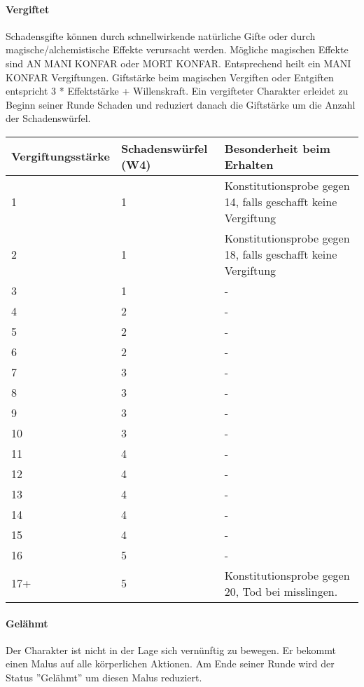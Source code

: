 \documentclass{article}
\begin{document}
\paragraph{Vergiftet}

Schadensgifte können durch schnellwirkende natürliche Gifte oder durch magische/alchemistische Effekte verursacht
werden. Mögliche magischen Effekte sind AN MANI KONFAR oder MORT KONFAR. Entsprechend heilt ein MANI KONFAR
Vergiftungen. Giftstärke beim magischen Vergiften oder Entgiften entspricht 3 * Effektstärke + Willenskraft. Ein
vergifteter Charakter erleidet zu Beginn seiner Runde Schaden und reduziert danach die Giftstärke um die Anzahl der
Schadenswürfel.


\begin{small}
\begin{tabular}{|m{3cm}|m{4cm}|m{5cm}|}
\hline
\textbf{Vergiftungsstärke}&\textbf{Schadenswürfel (W4)}&\textbf{Besonderheit beim Erhalten}\\
\hline
\hline
1&1&Konstitutionsprobe gegen 14, falls geschafft keine Vergiftung\\
\hline
2&1&Konstitutionsprobe gegen 18, falls geschafft keine Vergiftung\\
\hline
3&1&-\\
\hline
4&2&-\\
\hline
5&2&-\\
\hline
6&2&-\\
\hline
7&3&-\\
\hline
8&3&-\\
\hline
9&3&-\\
\hline
10&3&-\\
\hline
11&4&-\\
\hline
12&4&-\\
\hline
13&4&-\\
\hline
14&4&-\\
\hline
15&4&-\\
\hline
16&5&-\\
\hline
17+&5&Konstitutionsprobe gegen 20, Tod bei misslingen.\\
\hline
\end{tabular}
\end{small}

\paragraph{Gelähmt}

Der Charakter ist nicht in der Lage sich vernünftig zu bewegen. Er bekommt einen Malus auf alle körperlichen Aktionen.
Am Ende seiner Runde wird der Status ''Gelähmt'' um diesen Malus reduziert.
\end{document}
